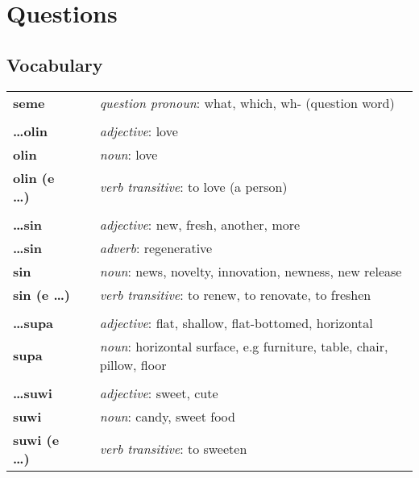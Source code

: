\section{Questions}
\subsection*{Vocabulary}
%
% 
%
\begin{supertabular}{p{2,5cm}|ll}
\textbf{seme} && \textit{question pronoun}: what, which, wh- (question word) \\ %
 && \\ %
\textbf{\dots olin} && \textit{adjective}: love \\ %
\textbf{olin} && \textit{noun}: love \\ %
\textbf{olin (e \dots)} && \textit{verb transitive}: to love (a person) \\ %
 && \\ %
\textbf{\dots sin} && \textit{adjective}: new, fresh, another, more \\ %
\textbf{ \dots sin } && \textit{adverb}: regenerative \\ %
\textbf{sin} && \textit{noun}: news, novelty, innovation, newness, new release \\ %
\textbf{sin (e \dots)} && \textit{verb transitive}: to renew, to renovate, to freshen \\ %
 && \\ %
\textbf{\dots supa} && \textit{adjective}: flat, shallow, flat-bottomed, horizontal \\ %
\textbf{supa} && \textit{noun}: horizontal surface, e.g furniture, table, chair, pillow, floor \\ %
 && \\ %
\textbf{\dots suwi} && \textit{adjective}: sweet, cute \\ %
\textbf{suwi} && \textit{noun}: candy, sweet food \\ %
\textbf{suwi (e \dots)} && \textit{verb transitive}: to sweeten \\ %
\end{supertabular} \\
%
{}
